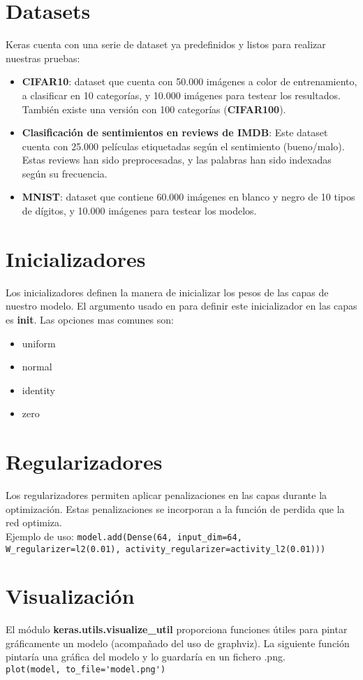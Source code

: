 \section{Datasets}
Keras cuenta con una serie de dataset ya predefinidos y listos para realizar nuestras pruebas:
\begin{itemize}
\item \textbf{CIFAR10}: dataset que cuenta con 50.000 imágenes a color de entrenamiento, a clasificar en 10 categorías, y 10.000 imágenes para testear los resultados. También existe una versión con 100 categorías (\textbf{CIFAR100}).
\item \textbf{Clasificación de sentimientos en reviews de IMDB}: Este dataset cuenta con 25.000 películas etiquetadas según el sentimiento (bueno/malo). Estas reviews han sido preprocesadas, y las palabras han sido indexadas según su frecuencia.
\item \textbf{MNIST}: dataset que contiene 60.000 imágenes en blanco y negro de 10 tipos de dígitos, y 10.000 imágenes para testear los modelos.
\end{itemize}
\section{Inicializadores}
Los inicializadores definen la manera de inicializar los pesos de las capas de nuestro modelo. El argumento usado en para definir este inicializador en las capas es \textbf{init}. Las opciones mas comunes son:
\begin{itemize}[noitemsep]
\item uniform
\item normal
\item identity
\item zero
\end{itemize}
\section{Regularizadores}
Los regularizadores permiten aplicar penalizaciones en las capas durante la optimización. Estas penalizaciones se incorporan a la función de perdida que la red optimiza.\\
Ejemplo de uso:
\lstinline{model.add(Dense(64, input_dim=64, W_regularizer=l2(0.01), activity_regularizer=activity_l2(0.01)))}
\section{Visualización}
El módulo \textbf{keras.utils.visualize\_util} proporciona funciones útiles para pintar gráficamente un modelo (acompañado del uso de graphviz). La siguiente función pintaría una gráfica del modelo y lo guardaría en un fichero .png.\\
\lstinline{plot(model, to_file='model.png')}
